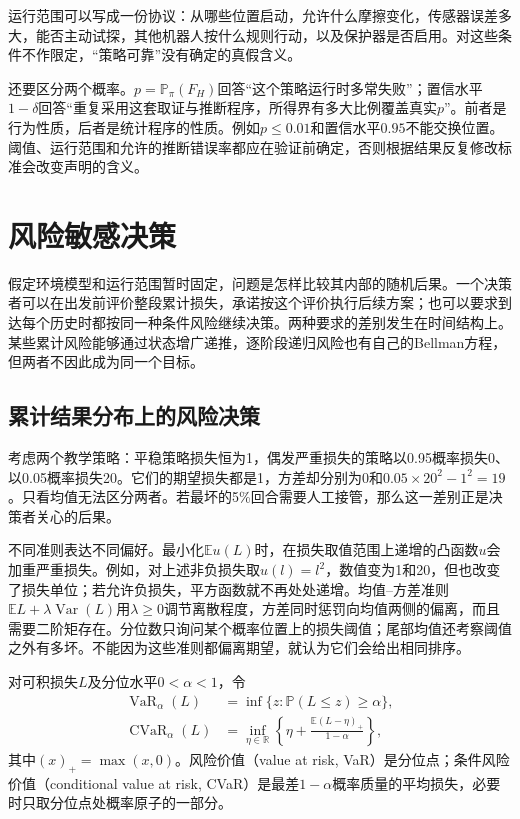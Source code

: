 运行范围可以写成一份协议：从哪些位置启动，允许什么摩擦变化，传感器误差多大，能否主动试探，其他机器人按什么规则行动，以及保护器是否启用。对这些条件不作限定，“策略可靠”没有确定的真假含义。

还要区分两个概率。$p=\mathbb P_\pi(F_H)$回答“这个策略运行时多常失败”；置信水平$1-\delta$回答“重复采用这套取证与推断程序，所得界有多大比例覆盖真实$p$”。前者是行为性质，后者是统计程序的性质。例如$p\leq0.01$和置信水平$0.95$不能交换位置。阈值、运行范围和允许的推断错误率都应在验证前确定，否则根据结果反复修改标准会改变声明的含义。

\section{风险敏感决策}
\label{sec:rl-trustworthy-risk}

假定环境模型和运行范围暂时固定，问题是怎样比较其内部的随机后果。一个决策者可以在出发前评价整段累计损失，承诺按这个评价执行后续方案；也可以要求到达每个历史时都按同一种条件风险继续决策。两种要求的差别发生在时间结构上。某些累计风险能够通过状态增广递推，逐阶段递归风险也有自己的Bellman方程，但两者不因此成为同一个目标。

\subsection{累计结果分布上的风险决策}
\label{sec:rl-trustworthy-static-risk}

考虑两个教学策略：平稳策略损失恒为1，偶发严重损失的策略以0.95概率损失0、以0.05概率损失20。它们的期望损失都是1，方差却分别为0和$0.05\times20^2-1^2=19$。只看均值无法区分两者。若最坏的5\%回合需要人工接管，那么这一差别正是决策者关心的后果。

不同准则表达不同偏好。最小化$\mathbb E u(L)$时，在损失取值范围上递增的凸函数$u$会加重严重损失。例如，对上述非负损失取$u(l)=l^2$，数值变为1和20，但也改变了损失单位；若允许负损失，平方函数就不再处处递增。均值--方差准则$\mathbb E L+\lambda\operatorname{Var}(L)$用$\lambda\geq0$调节离散程度，方差同时惩罚向均值两侧的偏离，而且需要二阶矩存在。分位数只询问某个概率位置上的损失阈值；尾部均值还考察阈值之外有多坏。不能因为这些准则都偏离期望，就认为它们会给出相同排序。

\begin{definition}[损失上尾的VaR与CVaR]
  \label{def:rl-trustworthy-cvar}
  对可积损失$L$及分位水平$0<\alpha<1$，令
  \begin{align}
    \operatorname{VaR}_\alpha(L)
      &=\inf\{z:\mathbb P(L\leq z)\geq\alpha\}, \\
    \operatorname{CVaR}_\alpha(L)
      &=\inf_{\eta\in\mathbb R}
        \left\{\eta+\frac{\mathbb E(L-\eta)_+}{1-\alpha}\right\},
      \label{eq:rl-trustworthy-cvar}
  \end{align}
  其中$(x)_+=\max(x,0)$。风险价值（value at risk, VaR）是分位点；条件风险价值（conditional value at risk, CVaR）是最差$1-\alpha$概率质量的平均损失，必要时只取分位点处概率原子的一部分。
\end{definition}

